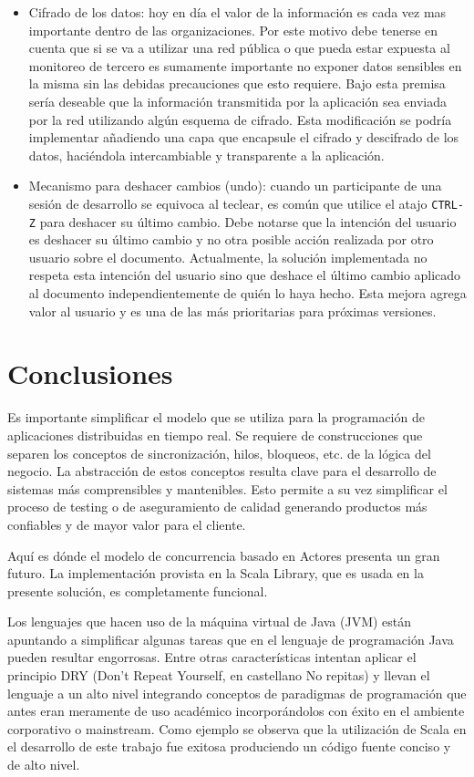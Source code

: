 \documentclass[12pt,a4paper]{article}
\begin{document}
\begin{itemize}
	\item Cifrado de los datos: hoy en día el valor de la información es cada vez mas importante dentro de las organizaciones. 
		Por este motivo debe tenerse en cuenta que si se va a utilizar una red pública o que pueda estar expuesta al monitoreo
		de tercero es sumamente importante no exponer datos sensibles en la misma sin las debidas precauciones que esto requiere.
		Bajo esta premisa sería deseable que la información transmitida por la aplicación sea enviada por la red utilizando algún
		esquema de cifrado. Esta modificación se podría implementar añadiendo una capa que encapsule el cifrado y descifrado de
		los datos, haciéndola intercambiable y transparente a la aplicación.

	\item Mecanismo para deshacer cambios (undo): cuando un participante de una sesión de desarrollo se equivoca al teclear, es común
		que utilice el atajo \texttt{CTRL-Z} para deshacer su último cambio. Debe notarse que la intención del usuario es deshacer su
		último cambio y no otra posible acción realizada por otro usuario sobre el documento. Actualmente, la solución implementada
		no respeta esta intención del usuario sino que deshace el último cambio aplicado al documento independientemente de
		quién lo haya hecho. Esta mejora agrega valor al usuario y es una de las más prioritarias para próximas versiones.

\end{itemize}

\section{Conclusiones}

Es importante simplificar el modelo que se utiliza para la programación de aplicaciones distribuidas
en tiempo real. Se requiere de construcciones que separen los conceptos de sincronización, hilos, bloqueos, etc.
de la lógica del negocio. La abstracción de estos conceptos resulta clave para el desarrollo de sistemas
más comprensibles y mantenibles. Esto permite a su vez simplificar el proceso de testing o de aseguramiento
de calidad generando productos más confiables y de mayor valor para el cliente.

Aquí es dónde el modelo de concurrencia basado en Actores presenta un gran futuro. La implementación provista en la
Scala Library, que es usada en la presente solución, es completamente funcional.

Los lenguajes que hacen uso de la máquina virtual de Java (JVM) están apuntando a simplificar algunas tareas que en el lenguaje
de programación Java pueden resultar engorrosas. Entre otras características intentan aplicar el principio DRY (Don't Repeat
Yourself, en castellano No repitas) y llevan el lenguaje a un alto nivel integrando conceptos de paradigmas de 
programación que antes eran meramente de uso académico incorporándolos con éxito en el ambiente corporativo o mainstream.
Como ejemplo se observa que la utilización de Scala en el desarrollo de este trabajo fue exitosa produciendo un código fuente
conciso y de alto nivel.
\end{document}
